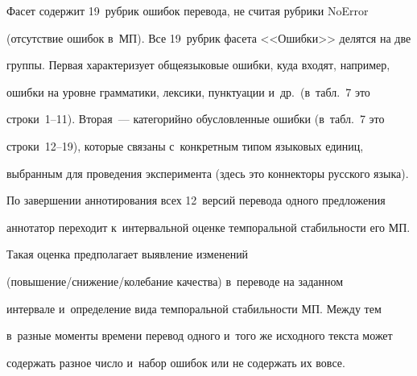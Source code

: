 \noindent


Фасет содержит 19~руб\-рик ошибок перевода, не считая рубрики NoError 


(отсутствие ошибок в~МП). Все 19~руб\-рик фасета <<Ошибки>> делятся на две 


группы. Первая характеризует общеязыковые ошибки, куда входят, например, 


ошибки на уровне грамматики, лексики, пунктуации и~др.\ (в~табл.~7 это 


строки~1--11). Вторая~--- категорийно обусловленные ошибки (в~табл.~7 это 


строки~12--19), которые связаны с~конкретным типом языковых единиц, 


выбранным для проведения эксперимента (здесь это коннекторы русского языка). 





 


  


  По завершении аннотирования всех 12~версий перевода одного предложения 


аннотатор переходит к~интервальной оценке темпоральной стабильности его МП. 


Такая оценка предполагает выявление изменений  


(по\-вы\-ше\-ние/сни\-же\-ние/ко\-ле\-ба\-ние качества) в~переводе на заданном 


интервале и~определение вида темпоральной стабильности МП. Между тем 


в~разные моменты времени перевод одного и~того же исходного текста может 


содержать разное число и~набор ошибок или не содержать их вовсе. 





\setcounter{table}{6}


